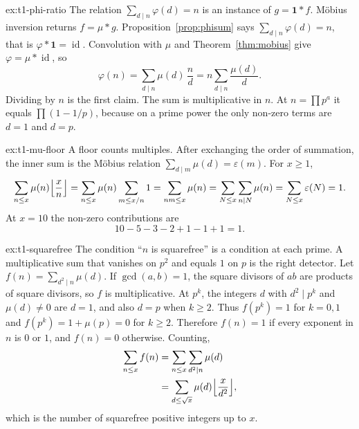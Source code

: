 \begin{solution}{ex:t1-phi-ratio}
\idea The relation $\sum_{d\mid n}\varphi(d)=n$ is an instance of $g=\mathbf1*f$. M\"obius inversion returns $f=\mu*g$.
\writeup Proposition~\ref{prop:phisum} says $\sum_{d\mid n}\varphi(d)=n$, that is $\varphi*\mathbf1=\operatorname{id}$. Convolution with $\mu$ and Theorem~\ref{thm:mobius} give $\varphi=\mu*\operatorname{id}$, so
\[
\varphi(n)=\sum_{d\mid n}\mu(d)\,\frac nd=n\sum_{d\mid n}\frac{\mu(d)}d.
\]
Dividing by $n$ is the first claim. The sum is multiplicative in $n$. At $n=\prod p^a$ it equals $\prod(1-1/p)$, because on a prime power the only non-zero terms are $d=1$ and $d=p$.
\end{solution}

\begin{solution}{ex:t1-mu-floor}
\idea A floor counts multiples. After exchanging the order of summation, the inner sum is the M\"obius relation $\sum_{d\mid m}\mu(d)=\varepsilon(m)$.
\writeup For $x\ge1$,
\[
\sum_{n\le x}\mu(n)\Bigl\lfloor\frac xn\Bigr\rfloor
=\sum_{n\le x}\mu(n)\sum_{m\le x/n}1
=\sum_{nm\le x}\mu(n)
=\sum_{N\le x}\sum_{n\mid N}\mu(n)
=\sum_{N\le x}\varepsilon(N)=1.
\]
At $x=10$ the non-zero contributions are
\[
10-5-3-2+1-1+1=1.
\]
\end{solution}

\begin{solution}{ex:t1-squarefree}
\idea The condition ``$n$ is squarefree'' is a condition at each prime. A multiplicative sum that vanishes on $p^2$ and equals $1$ on $p$ is the right detector.
\writeup Let $f(n)=\sum_{d^2\mid n}\mu(d)$. If $\gcd(a,b)=1$, the square divisors of $ab$ are products of square divisors, so $f$ is multiplicative. At $p^k$, the integers $d$ with $d^2\mid p^k$ and $\mu(d)\ne0$ are $d=1$, and also $d=p$ when $k\ge2$. Thus $f(p^k)=1$ for $k=0,1$ and $f(p^k)=1+\mu(p)=0$ for $k\ge2$. Therefore $f(n)=1$ if every exponent in $n$ is $0$ or $1$, and $f(n)=0$ otherwise. Counting,
\begin{align*}
\sum_{n\le x}f(n)
&=\sum_{n\le x}\sum_{d^2\mid n}\mu(d)\\
&=\sum_{d\le\sqrt x}\mu(d)\Bigl\lfloor\frac x{d^2}\Bigr\rfloor,
\end{align*}
which is the number of squarefree positive integers up to $x$.
\end{solution}

